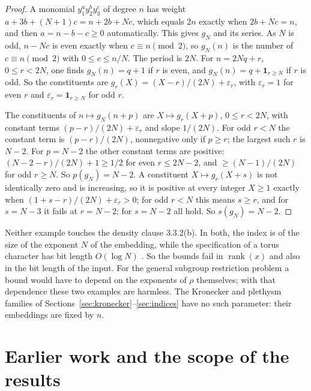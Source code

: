 \documentclass[11pt,a4paper]{article}
\theoremstyle{definition}
\newcommand{\rank}{\operatorname{rank}}
\begin{document}
\begin{proof}
A monomial $y_1^ay_2^by_3^c$ of degree $n$ has weight $a+3b+(N+1)c=n+2b+Nc$,
which equals $2n$ exactly when $2b+Nc=n$, and then $a=n-b-c\ge0$ automatically.
This gives $g_N$ and its series. As $N$ is odd, $n-Nc$ is even exactly when
$c\equiv n\pmod2$, so $g_N(n)$ is the number of $c\equiv n\pmod2$ with
$0\le c\le n/N$. The period is $2N$. For $n=2Nq+r$, $0\le r<2N$, one finds
$g_N(n)=q+1$ if $r$ is even, and $g_N(n)=q+\mathbf1_{r\ge N}$ if $r$ is odd. So
the constituents are $g_r(X)=(X-r)/(2N)+\varepsilon_r$, with $\varepsilon_r=1$
for even $r$ and $\varepsilon_r=\mathbf1_{r\ge N}$ for odd $r$.

The constituents of $n\mapsto g_N(n+p)$ are $X\mapsto g_r(X+p)$, $0\le r<2N$,
with constant terms $(p-r)/(2N)+\varepsilon_r$ and slope $1/(2N)$. For odd
$r<N$ the constant term is $(p-r)/(2N)$, nonnegative only if $p\ge r$; the
largest such $r$ is $N-2$. For $p=N-2$ the other constant terms are positive:
$(N-2-r)/(2N)+1\ge1/2$ for even $r\le2N-2$, and $\ge(N-1)/(2N)$ for odd
$r\ge N$. So $p(g_N)=N-2$. A constituent $X\mapsto g_r(X+s)$ is not
identically zero and is increasing, so it is positive at every integer $X\ge1$
exactly when $(1+s-r)/(2N)+\varepsilon_r>0$; for odd $r<N$ this means $s\ge r$,
and for $s=N-3$ it fails at $r=N-2$; for $s=N-2$ all hold. So $s(g_N)=N-2$.
\end{proof}

Neither example touches the density clause 3.3.2(b). In both, the index is of
the size of the exponent $N$ of the embedding, while the specification of a
torus character has bit length $O(\log N)$ \cite[Section 3.4.2, p.~56]{GCT6}.
So the bounds fail in $\rank(x)$ and also in the bit length of the input. For
the general subgroup restriction problem a bound would have to depend on the
exponents of $\rho$ themselves; with that dependence these two examples are
harmless. The Kronecker and plethysm families of
Sections~\ref{sec:kronecker}--\ref{sec:indices} have no such parameter: their
embeddings are fixed by $n$.

\section{Earlier work and the scope of the results}\label{sec:literature}
\end{document}
